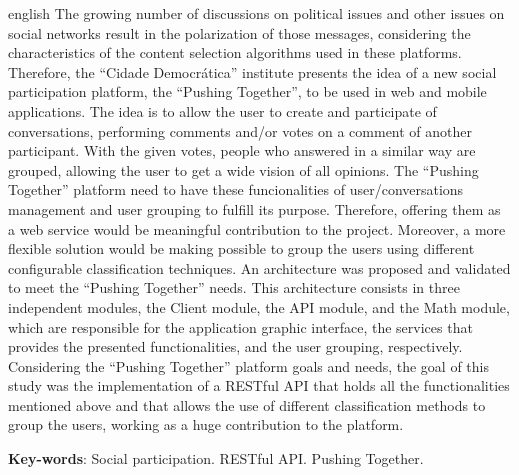 \begin{resumo}[Abstract]
 \begin{otherlanguage*}{english}
  The growing number of discussions on political issues and other issues on social networks
  result in the polarization of those messages, considering the characteristics
  of the content selection algorithms used in these platforms. Therefore,
  the ``Cidade Democrática'' institute presents the idea of a new social participation
  platform, the ``Pushing Together'', to be used in web and mobile applications.
  The idea is to allow the user to create and participate of conversations, performing
  comments and/or votes on a comment of another participant. With the given votes, people
  who answered in a similar way are grouped, allowing the user to get a wide
  vision of all opinions.
  The ``Pushing Together'' platform need to have these funcionalities of user/conversations management and user grouping to fulfill its purpose. Therefore, offering them as a web service would be meaningful contribution to the project. Moreover, a more flexible solution would be making possible to group the users using different configurable classification techniques.
  An architecture was proposed and validated to meet the ``Pushing Together'' needs. This architecture consists in three independent modules, the Client module, the API module, and the Math module, which are responsible for the application graphic interface, the services that provides the presented functionalities, and the user grouping, respectively.
  Considering the ``Pushing Together'' platform goals and needs,
  the goal of this study was the implementation of a RESTful API that holds all the functionalities mentioned above and that allows the use of different classification methods to group the users, working as a huge contribution to the platform.

   \vspace{\onelineskip}

   \noindent
   \textbf{Key-words}: Social participation. RESTful API. Pushing Together.
 \end{otherlanguage*}
\end{resumo}
